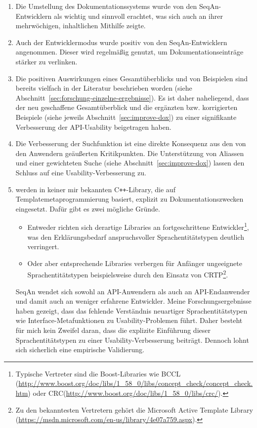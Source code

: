 \documentclass[11pt,a4paper]{book}
\newcommand{\sref}[1]{Abschnitt~\ref{#1}}
\begin{document}
\begin{enumerate}
    \item Die Umstellung des Dokumentationssystems wurde von den SeqAn-Entwicklern als wichtig und sinnvoll erachtet, was sich auch an ihrer mehrwöchigen, inhaltlichen Mithilfe zeigte.
    \item Auch der Entwicklermodus wurde positiv von den SeqAn-Entwicklern angenommen. Dieser wird regelmäßig genutzt, um Dokumentationseinträge stärker zu verlinken.
    \item Die positiven Auswirkungen eines Gesamtüberblicks und von Beispielen sind bereits vielfach in der Literatur beschrieben worden (siehe \sref{sec:forschung-einzelne-ergebnisse}). Es ist daher naheliegend, dass der neu geschaffene Gesamtüberblick und die ergänzten bzw. korrigierten Beispiele (siehe jeweils \sref{sec:improve-dox}) zu einer signifikante Verbesserung der API-Usability beigetragen haben.
    \item Die Verbesserung der Suchfunktion ist eine direkte Konsequenz aus den von den Anwendern geäußerten Kritikpunkten. Die Unterstützung von Aliassen und einer gewichteten Suche (siehe  \sref{sec:improve-dox}) lassen den Schluss auf eine Usability-Verbesserung zu.
    \item {} werden in keiner mir bekannten C\texttt{++}-Library, die auf Templatemetaprogrammierung basiert, explizit zu Dokumentationszwecken eingesetzt. Dafür gibt es zwei mögliche Gründe.
    \begin{itemize}
      \item Entweder richten sich derartige Libraries an fortgeschrittene Entwickler\footnote{Typische Vertreter sind die Boost-Libraries wie BCCL (\url{http://www.boost.org/doc/libs/1_58_0/libs/concept_check/concept_check.htm}) oder CRC(\url{http://www.boost.org/doc/libs/1_58_0/libs/crc/}).}, was den Erklärungsbedarf anspruchsvoller Sprachentitätstypen deutlich verringert.
      \item Oder aber entsprechende Libraries verbergen für Anfänger ungeeignete Sprachentitätstypen beispielsweise durch den Einsatz von CRTP\footnote{Zu den bekanntesten Vertretern gehört die Microsoft Active Template Library (\url{https://msdn.microsoft.com/en-us/library/4e07a759.aspx}).}.
    \end{itemize}
    SeqAn wendet sich sowohl an API-Anwendern als auch an API-Endanwender und damit auch an weniger erfahrene Entwickler. Meine Forschungsergebnisse haben gezeigt, dass das fehlende Verständnis neuartiger Sprachentitätstypen wie Interface-Metafunktionen zu Usability-Problemen führt. Daher besteht für mich kein Zweifel daran, dass die explizite Einführung dieser Sprachentitätstypen zu einer Usability-Verbesserung beiträgt. Dennoch lohnt sich sicherlich eine empirische Validierung.
  \end{enumerate}
\end{document}

